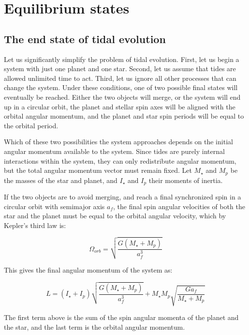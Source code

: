 \section{Equilibrium states}
%
\label{sec:equilibrium}

\subsection{The end state of tidal evolution}

Let us significantly simplify the problem of tidal evolution. First, let us
begin a system with just one planet and one star. Second, let us assume that
tides are allowed unlimited time to act. Third, let us ignore all other
processes that can change the system. Under these conditions, one of two
possible final states will eventually be reached. Either the two objects will
merge, or the system will end up in a circular orbit, the planet and stellar
spin axes will be aligned with the orbital angular momentum, and the planet and
star spin periods will be equal to the orbital period.

Which of these two possibilities the system approaches depends on the initial
angular momentum available to the system. Since tides are purely internal
interactions within the system, they can only redistribute angular momentum, but
the total angular momentum vector must remain fixed. Let $M_\star$ and $M_p$ be
the masses of the star and planet, and $I_\star$ and $I_p$ their moments of
inertia.

If the two objects are to avoid merging, and reach a final synchronized spin in
a circular orbit with semimajor axis $a_f$, the final spin angular velocities of
both the star and the planet must be equal to the orbital angular velocity,
which by Kepler's third law is:

\begin{equation}
%
    \Omega_{orb} = \sqrt{\frac{G (M_\star + M_p)}{a_f^3}}
%
\end{equation}

This gives the final angular momentum of the system as:

\begin{equation}
%
    L
%
    =
%
    \left(I_\star + I_p\right) \sqrt{\frac{G (M_\star + M_p)}{a_f^3}}
%
    +
%
    M_\star M_p \sqrt{\frac{G a_f}{M_\star + M_p}}
%
    \label{eq:equilibrium_angmom}
%
\end{equation}

The first term above is the sum of the spin angular momenta of the planet and
the star, and the last term is the orbital angular momentum.

